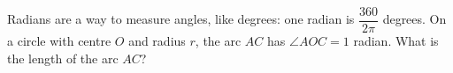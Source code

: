 Radians are a way to measure angles, like degrees: one radian is $\dfrac{360}{2\pi}$ degrees. On a circle with centre $O$ and radius $r$, the arc $AC$ has $\angle AOC=1$ radian. What is the length of the arc $AC$?
